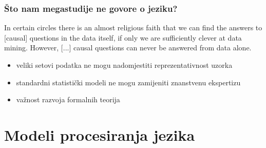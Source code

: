 \documentclass[aspectratio=169]{beamer}
\newcommand{\tinycitep}[1]{%
    \bgroup
    \scriptsize
    \citep{#1}
    \egroup}
\begin{document}
\begin{frame}
    \frametitle{Što nam megastudije ne govore o jeziku?}

    \hspace*{\fill}
    \raisebox{37.4pt}{
        \begin{minipage}[t]{1em}
            \fontsize{56}{66}\selectfont
            \bfseries
            ,,
        \end{minipage}
    }
    \begin{minipage}{24em}
        In certain circles there is an almost religious faith that we can find
        the answers to [causal] questions in the data itself, if only we are
        sufficiently clever at data mining. However, [...] causal questions
        can never be answered from data alone.

        \bigskip

        \raggedleft
        \scriptsize
        \citet[str. 351]{pearlBookWhyNew2018}
    \end{minipage}
    \hspace*{\fill}

\end{frame}

\begin{frame}
    \begin{itemize}
        \item veliki setovi podatka ne mogu nadomjestiti reprezentativnost
            uzorka \tinycitep{mengStatisticalParadisesParadoxes2018}

        \pause

        \item standardni statistički modeli ne mogu zamijeniti znanstvenu
            ekspertizu
            \bgroup
            \scriptsize
            \citep[str. 526]{mcelreathStatisticalRethinkingBayesian2020}
            \egroup

        \pause

        \item važnost razvoja formalnih teorija
            \tinycitep{fiedlerToolsToysTruisms2004,
            navarroIfMathematicalPsychology2020,navarroDevilDeepBlue2019}
    \end{itemize}
\end{frame}

\section{Modeli procesiranja jezika}
\end{document}
